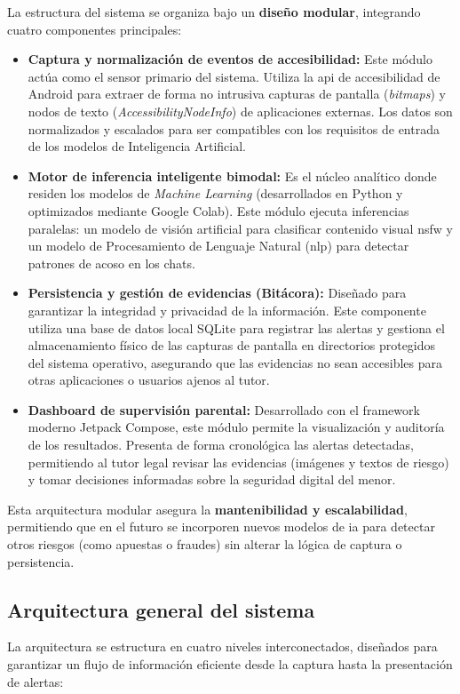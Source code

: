 La estructura del sistema se organiza bajo un \textbf{diseño modular}, integrando cuatro componentes principales:
\begin{itemize}
    \item \textbf{Captura y normalización de eventos de accesibilidad:} Este módulo actúa como el sensor primario del sistema. Utiliza la \gls{api} de accesibilidad de Android para extraer de forma no intrusiva capturas de pantalla (\textit{bitmaps}) y nodos de texto (\textit{AccessibilityNodeInfo}) de aplicaciones externas. Los datos son normalizados y escalados para ser compatibles con los requisitos de entrada de los modelos de Inteligencia Artificial.
    \item \textbf{Motor de inferencia inteligente bimodal:} Es el núcleo analítico donde residen los modelos de \textit{Machine Learning} (desarrollados en Python y optimizados mediante Google Colab). Este módulo ejecuta inferencias paralelas: un modelo de visión artificial para clasificar contenido visual \gls{nsfw} y un modelo de Procesamiento de Lenguaje Natural (\gls{nlp}) para detectar patrones de acoso en los chats.
    \item \textbf{Persistencia y gestión de evidencias (Bitácora):} Diseñado para garantizar la integridad y privacidad de la información. Este componente utiliza una base de datos local SQLite para registrar las alertas y gestiona el almacenamiento físico de las capturas de pantalla en directorios protegidos del sistema operativo, asegurando que las evidencias no sean accesibles para otras aplicaciones o usuarios ajenos al tutor.
    \item \textbf{Dashboard de supervisión parental:} Desarrollado con el framework moderno Jetpack Compose, este módulo permite la visualización y auditoría de los resultados. Presenta de forma cronológica las alertas detectadas, permitiendo al tutor legal revisar las evidencias (imágenes y textos de riesgo) y tomar decisiones informadas sobre la seguridad digital del menor.
\end{itemize}

Esta arquitectura modular asegura la \textbf{mantenibilidad y escalabilidad}, permitiendo que en el futuro se incorporen nuevos modelos de \gls{ia} para detectar otros riesgos (como apuestas o fraudes) sin alterar la lógica de captura o persistencia.

\subsection{Arquitectura general del sistema}
La arquitectura se estructura en cuatro niveles interconectados, diseñados para garantizar un flujo de información eficiente desde la captura hasta la presentación de alertas:\\


